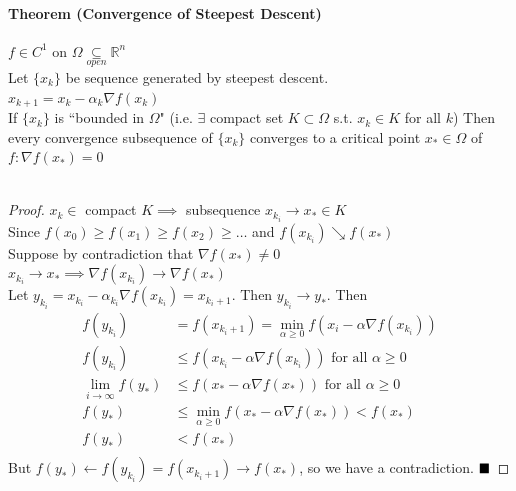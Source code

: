 \documentclass[11pt]{article}
\newcommand{\real}[0]{\mathbb{R}}
\newcommand{\qed}[0]{$\hfill\blacksquare$}
\begin{document}
\paragraph{Theorem (Convergence of Steepest Descent)}
$f \in C^1$ on $\Omega \underset{open}{\subseteq} \real^n$ \\
Let $\{ x_k\}$ be sequence generated by steepest descent. \\
$x_{k+1} = x_k - \alpha_k \nabla f(x_k)$ \\
If $\{ x_k\}$ is ``bounded in $\Omega$" (i.e. $\exists$ compact set $K \subset \Omega$ s.t. $x_k \in K$ for all $k$)
Then every convergence subsequence of $\{ x_k\}$ converges to a critical point $x_* \in \Omega$ of $f: \nabla f(x_*) = 0$\\\\
\begin{proof}
	$x_k \in$ compact $K \implies$ subsequence $x_{k_i} \rightarrow x_* \in K$ \\
	Since $f(x_0) \geq f(x_1) \geq f(x_2) \geq \hdots$ and $f(x_{k_i}) \searrow f(x_*)$\\
	Suppose by contradiction that $\nabla f(x_*) \neq 0$ \\
	$x_{k_i} \rightarrow x_* \implies  \nabla f(x_{k_i}) \rightarrow \nabla f(x_*)$\\
	Let $y_{k_i} = x_{k_i} - \alpha_{k_i} \nabla f(x_{k_i}) = x_{k_i + 1}$. Then $y_{k_i} \rightarrow y_*$. Then
	\begin{align}
		f(y_{k_i}) &= f(x_{k_i + 1} ) = \underset{\alpha \geq 0}{\min} f(x_i - \alpha \nabla f(x_{k_i}))  \\
		f(y_{k_i}) &\leq f(x_{k_i} - \alpha \nabla f(x_{k_i})) \text{ for all $\alpha \geq 0$}\\
		\underset{i \rightarrow \infty}{\lim} f(y_*) &\leq f(x_* - \alpha \nabla f(x_*)) \text{ for all $\alpha \geq 0$} \\
		f(y_*) &\leq  \underset{\alpha \geq 0}{\min} f(x_* - \alpha \nabla f(x_*)) < f(x_*) \\
		f(y_*) &< f(x_*)\\
	\end{align}
	But $f(y_*) \leftarrow f(y_{k_i}) = f(x_{k_i + 1}) \rightarrow f(x_*)$, so we have a contradiction. \qed
\end{proof}
\end{document}
